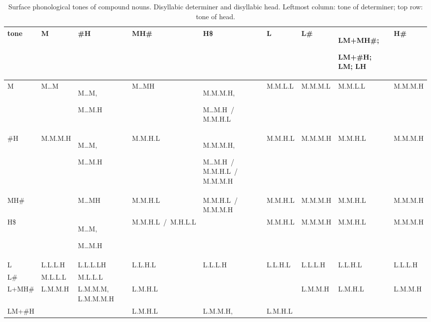 \begin{subtables}
\begin{table}
\caption{\label{tab:surfacedisyllabicdisyllables}Surface phonological tones of compound nouns. Disyllabic determiner and disyllabic head. Leftmost column: tone of determiner; top row: tone of head.}
{\renewcommand{\arraystretch}{1.6}
{\fontsize{9}{10.75}\selectfont
\begin{tabularx}{\textwidth}{ l P{16mm} Q Q P{19mm} P{15mm} Q P{23mm} P{16mm} }
\lsptoprule
	tone & M & \#H & MH\# & H\$ & L & L\# & LM+MH\#;\par LM+\#H; LM; LH & H\#\\\midrule
	M & M{\dots}M & M{\dots}M,\par M{\dots}M.H & M{\dots}MH & M.M.M.H,\par M{\dots}M.H~/ M.M.H.L & M.M.L.L & M.M.M.L & M.M.L.L & M.M.M.H\\
	\#H & M.M.M.H & M{\dots}M,\par M{\dots}M.H & M.M.H.L & M.M.M.H,\par M{\dots}M.H~/ M.M.H.L~/ M.M.M.H & M.M.H.L & M.M.M.H & M.M.H.L & M.M.M.H\\
	MH\# &  & M{\dots}MH & M.M.H.L & M.M.H.L~/ M.M.M.H & M.M.H.L & M.M.M.H & M.M.H.L & M.M.M.H\\
	H\$ &  ~\par\hspace*{\fill} & M{\dots}M,\par M{\dots}M.H & \hbox{M.M.H.L~/ M.H.L.L} & ~\par\hspace*{\fill} & M.M.H.L & M.M.M.H & M.M.H.L & M.M.M.H\\
	L & L.L.L.H & L.L.L.LH & L.L.H.L & L.L.L.H & L.L.H.L & L.L.L.H & L.L.H.L & L.L.L.H\\
	L\# & M.L.L.L & M.L.L.L &  &  &  &  &  &  \hspace*{\fill}\\
	L+MH\# & L.M.M.H & L.M.M.M, L.M.M.M.H & L.M.H.L &  & ~\par\hspace*{\fill} & L.M.M.H & L.M.H.L & L.M.M.H\\
	LM+\#H &  \hspace*{\fill} &  & L.M.H.L & L.M.M.H, &
   L.M.H.L &  \hspace*{\fill} & \hspace*{\fill} &\\

\end{tabularx}}}
\end{table}
\end{subtables}
